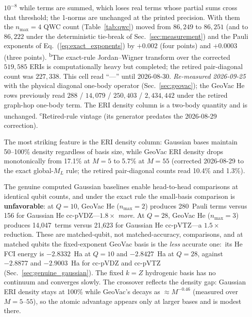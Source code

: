 \documentclass[aps,pra,twocolumn,superscriptaddress,longbibliography]{revtex4-2}
\newcommand{\gvq}[2]{#2}
\begin{document}
\begin{table}[t]
{$10^{-8}$ while terms are summed, which loses real terms whose partial sums
cross that threshold; the 1-norms are unchanged at the printed precision.
With them the $n_{\max}=4$ QWC count (Table~\ref{tab:qwc}) moved from
$86{,}249$ to $86{,}251$ (and to $86{,}222$ under the deterministic tie-break of
Sec.~\ref{sec:measurement}) and the Pauli exponents of Eq.~(\ref{eq:exact_exponents})
by $+0.002$ (four points) and $+0.0003$ (three points).
\textsuperscript{b}The exact-rule Jordan--Wigner
transform over the corrected $519{,}585$ ERIs is computationally heavy
but completed; the retired pair-diagonal count was
$227{,}338$.  This cell read ``---'' until 2026-08-30.
\emph{Re-measured 2026-09-25} with the physical diagonal one-body operator
(Sec.~\ref{sec:geovac}); the GeoVac He rows previously read
$288$ / $14{,}079$ / $250{,}403$ / $2{,}434{,}442$ under the retired
graph-hop one-body term.  The ERI density column is a two-body quantity
and is unchanged.
\textsuperscript{c}Retired-rule vintage (its generator predates the
2026-08-29 correction).}
\end{table}

The most striking feature is the ERI density column: Gaussian bases
maintain 50--100\% density regardless of basis size, while GeoVac ERI
density drops monotonically from 17.1\% at $M = 5$ to 5.7\% at $M = 55$
(corrected 2026-08-29 to the exact global-$M_L$ rule; the retired
pair-diagonal counts read 10.4\% and 1.3\%).

The genuine computed Gaussian baselines enable head-to-head comparisons
at identical qubit counts, and under the exact rule the small-basis
comparison is \textbf{unfavorable}: at $Q = 10$, GeoVac He
($n_{\max} = 2$) produces \gvq{he_n2_pauli}{280}~Pauli terms versus \gvq{he_ccpvdz_pauli}{156} for Gaussian He
cc-pVDZ---$1.8\times$ \emph{more}.  At $Q = 28$, GeoVac He
($n_{\max} = 3$) produces \gvq{he_n3_pauli}{14{,}047}~terms versus \gvq{he_ccpvtz_pauli}{21{,}623} for Gaussian
He cc-pVTZ---a $1.5\times$ reduction.
These are matched-qubit, not matched-accuracy, comparisons, and at
matched qubits the fixed-exponent GeoVac basis is the \emph{less}
accurate one:\ its He FCI energy is $-2.8332$~Ha at $Q = 10$ and
$-2.8427$~Ha at $Q = 28$, against $-2.8877$ and $-2.9003$~Ha for
cc-pVDZ and cc-pVTZ (Sec.~\ref{sec:genuine_gaussian}).  The
fixed $k = Z$ hydrogenic basis has no continuum and converges slowly.  The
crossover reflects the density gap: Gaussian ERI density stays at
100\% while GeoVac's decays as $\approx M^{\gvq{eri_decay_4pt}{-0.46}}$ (measured over
$M = 5$--$55$), so the atomic advantage appears only at larger bases and is
modest there.
\end{document}
